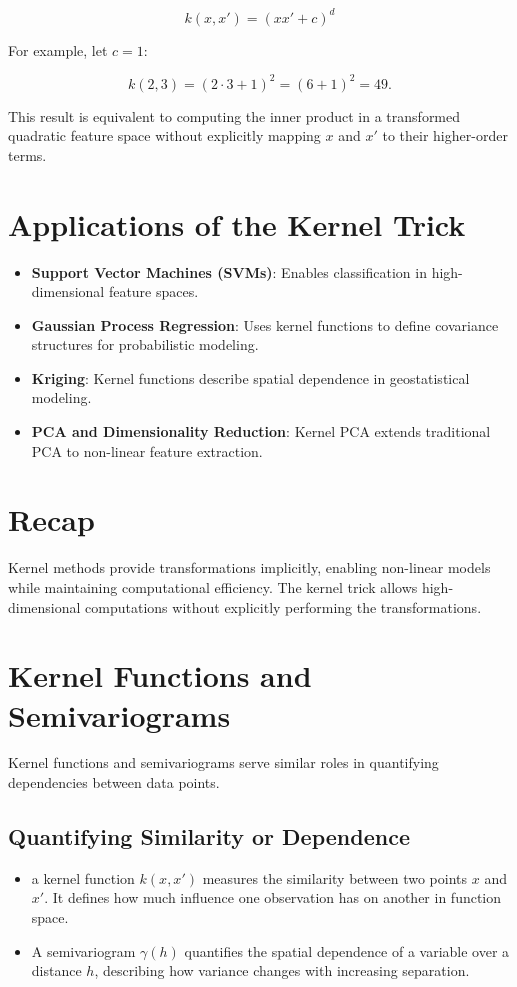 \documentclass{article}
\begin{document}
\[
k(x, x') = (x x' + c)^d
\]

For example, let \( c = 1 \):

\[
k(2,3) = (2 \cdot 3 + 1)^2 = (6 + 1)^2 = 49.
\]

This result is equivalent to computing the inner product in a transformed quadratic feature space without explicitly mapping \( x \) and \( x' \) to their higher-order terms.

\section{Applications of the Kernel Trick}
\begin{itemize}
    \item \textbf{Support Vector Machines (SVMs)}: Enables classification in high-dimensional feature spaces.
    \item \textbf{Gaussian Process Regression}: Uses kernel functions to define covariance structures for probabilistic modeling.
    \item \textbf{Kriging}: Kernel functions describe spatial dependence in geostatistical modeling.
    \item \textbf{PCA and Dimensionality Reduction}: Kernel PCA extends traditional PCA to non-linear feature extraction.
\end{itemize}

\section{Recap}
Kernel methods provide transformations implicitly, enabling non-linear models while maintaining computational efficiency. The kernel trick allows high-dimensional computations without explicitly performing the transformations.

\section{Kernel Functions and Semivariograms}

Kernel functions and semivariograms serve similar roles in quantifying dependencies between data points. 

\subsection{Quantifying Similarity or Dependence}
\begin{itemize}
    \item a kernel function \( k(x, x') \) measures the similarity between two points \( x \) and \( x' \). It defines how much influence one observation has on another in function space.
    \item A semivariogram \( \gamma(h) \) quantifies the spatial dependence of a variable over a distance \( h \), describing how variance changes with increasing separation.
\end{itemize}
\end{document}
